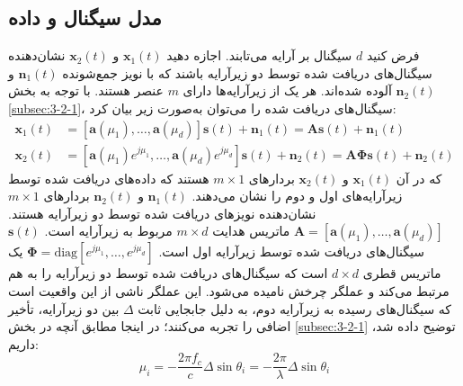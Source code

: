 \subsection{مدل سیگنال و داده}
\label{subsec:5-2-1}
فرض کنید $d$ سیگنال بر آرایه می‌تابند. اجازه دهید $\bm{x}_1(t)$ و $\bm{x}_2(t)$ نشان‌دهنده سیگنال‌های دریافت شده توسط دو زیرآرایه باشند که با نویز جمع‌شونده $\bm{n}_1(t)$ و $\bm{n}_2(t)$ آلوده شده‌اند. هر یک از زیرآرایه‌ها دارای $m$ عنصر هستند. با توجه به بخش \ref{subsec:3-2-1}، سیگنال‌های دریافت شده را می‌توان به‌صورت زیر بیان کرد:
\begin{subequations}
	\label{eq:5-1}
	\begin{align}
		\bm{x}_1(t) &= [\bm{a}(\mu_1), \dots, \bm{a}(\mu_d)] \bm{s}(t) + \bm{n}_1(t) = \bm{A}\bm{s}(t) + \bm{n}_1(t) \label{eq:5-1a} \\
		\bm{x}_2(t) &= [\bm{a}(\mu_1)e^{j\mu_1}, \dots, \bm{a}(\mu_d)e^{j\mu_d}] \bm{s}(t) + \bm{n}_2(t) = \bm{A}\bm{\Phi}\bm{s}(t) + \bm{n}_2(t) \label{eq:5-1b}
	\end{align}
\end{subequations}
که در آن $\bm{x}_1(t)$ و $\bm{x}_2(t)$ بردارهای $m \times 1$ هستند که داده‌های دریافت شده توسط زیرآرایه‌های اول و دوم را نشان می‌دهند. $\bm{n}_1(t)$ و $\bm{n}_2(t)$ بردارهای $m \times 1$ نشان‌دهنده نویزهای دریافت شده توسط دو زیرآرایه هستند. $\bm{A} = [\bm{a}(\mu_1), \dots, \bm{a}(\mu_d)]$ ماتریس هدایت $m \times d$ مربوط به زیرآرایه است. $\bm{s}(t)$ سیگنال‌های دریافت شده توسط زیرآرایه اول است. $\bm{\Phi} = \text{diag}[e^{j\mu_1}, \dots, e^{j\mu_d}]$ یک ماتریس قطری $d \times d$ است که سیگنال‌های دریافت شده توسط دو زیرآرایه را به هم مرتبط می‌کند و عملگر چرخش نامیده می‌شود. این عملگر ناشی از این واقعیت است که سیگنال‌های رسیده به زیرآرایه دوم، به دلیل جابجایی ثابت $\Delta$ بین دو زیرآرایه، تأخیر اضافی را تجربه می‌کنند؛ در اینجا مطابق آنچه در بخش \ref{subsec:3-2-1} توضیح داده شد، داریم:
\begin{equation}
	\mu_i = -\frac{2\pi f_c}{c} \Delta \sin \theta_i = -\frac{2\pi}{\lambda} \Delta \sin \theta_i
	\nonumber
\end{equation}

